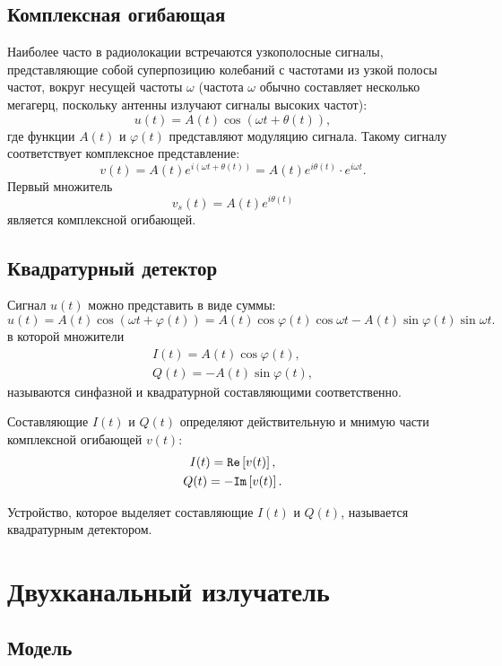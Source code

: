 \subsection{Комплексная огибающая}

Наиболее часто в радиолокации встречаются узкополосные сигналы, представляющие собой суперпозицию колебаний с частотами из узкой полосы частот, вокруг несущей
частоты $\omega$ (частота $\omega$ обычно составляет несколько мегагерц, поскольку антенны излучают сигналы высоких частот):
\[
    u(t) = A(t) \cos ( \omega t + \theta(t) ),
\]
где функции $A(t)$ и $\varphi(t)$ представляют модуляцию сигнала. Такому сигналу соответствует комплексное представление:
\[
    v(t)
    = A(t) e^{i ( \omega t + \theta(t) )}
    = A(t) e^{i \theta(t)} \cdot e^{i \omega t} .
\]
Первый множитель
\[
    v_s(t) = A(t) e^{i \theta(t)}
\]
является комплексной огибающей.


\subsection{Квадратурный детектор}

Сигнал $u(t)$ можно представить в виде суммы:
\[
    u(t)
    = A(t) \cos ( \omega t + \varphi(t) )
    = A(t) \cos \varphi(t) \cos \omega t - A(t) \sin \varphi(t) \sin \omega t .
\]
в которой множители
\begin{gather*}
    I(t) = A(t) \cos \varphi(t) , \\
    Q(t) = - A(t) \sin \varphi(t) ,
\end{gather*}
называются синфазной и квадратурной составляющими соответственно.

Составляющие $I(t)$ и $Q(t)$ определяют действительную и мнимую части комплексной огибающей $v(t)$:
\begin{gather*}
    I(t) = \mathtt{Re} \left [ v(t) \right ] , \\
    Q(t) = - \mathtt{Im} \left [ v(t) \right ] .
\end{gather*}

Устройство, которое выделяет составляющие $I(t)$ и $Q(t)$, называется квадратурным детектором.


\section{Двухканальный излучатель}

\subsection{Модель}

